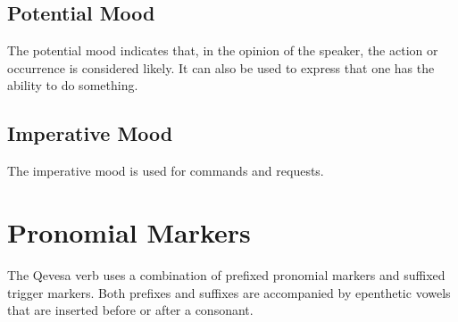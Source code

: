 \documentclass[grammar]{subfiles}
\begin{document}
\subsection{Potential Mood}
\label{ssec:vm:potential}

The potential mood indicates that, in the opinion of the speaker, the
action or occurrence is considered likely.  It can also be used to express that
one has the ability to do something.


\subsection{Imperative Mood}
\label{ssec:vm:imperative}

The imperative mood is used for commands and requests. 

\section{Pronomial Markers}
\label{sec:vm:pronomial_markers}

The Qevesa verb uses a combination of prefixed pronomial markers and suffixed
trigger markers. Both prefixes and suffixes are accompanied by epenthetic vowels
that are inserted before or after a consonant.
\end{document}
